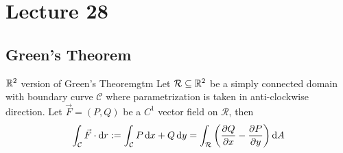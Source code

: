 \documentclass[../Analysis-3]{subfiles}
\begin{document}
\chapter*{Lecture 28} %
\setcounter{chapter}{28} %
\setcounter{section}{0}

\newcommand{\inti}[3]{\int_{#1} {#2} \hspace{0.1cm} \dd {#3}}

\section{Green's Theorem}
\begin{Thm}{$\mathbb{R}^2$ version of Green's Theorem}{gtm}
    Let $\mathcal{R} \subseteq \mathbb{R}^2 $ be a simply connected domain with boundary curve $\mathcal{C}$ where parametrization is taken in anti-clockwise direction. Let $\vec{F} = (P,Q)$ be a $C^1$ vector field on $\mathcal{R}$, then
    \[
        \int_{\mathcal{C}} \vec{F} \cdot \dd r := \int_{\mathcal{C}} P \, \dd x + Q \, \dd y = \int_{\mathcal{R}} \left( \pdv{Q}{x} - \pdv{P}{y}\right) \dd A
    \]
\end{Thm}
\end{document}
